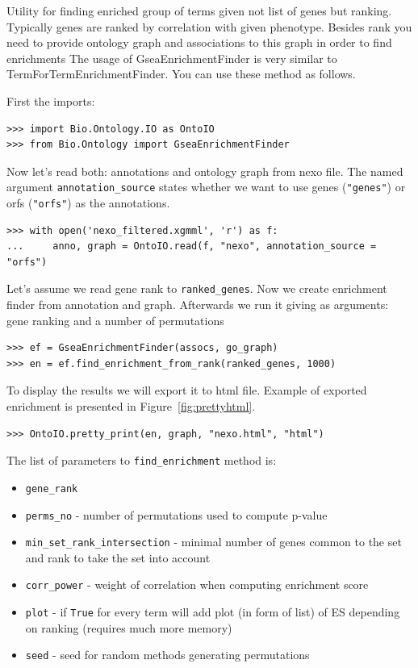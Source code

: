 \documentclass{report}
\begin{document}
Utility for finding enriched group of terms given not list of genes
but ranking. Typically genes are ranked by correlation with given
phenotype. Besides rank you need to provide ontology graph and
associations to this graph in order to find enrichments
The usage of GseaEnrichmentFinder is very similar to
TermForTermEnrichmentFinder. You can use these method as follows.

First the imports:
\begin{verbatim}
>>> import Bio.Ontology.IO as OntoIO
>>> from Bio.Ontology import GseaEnrichmentFinder
\end{verbatim}

Now let's read both: annotations and ontology graph from nexo file. The named
argument \verb|annotation_source| states whether we want to use genes (\verb|"genes"|)
or orfs (\verb|"orfs"|) as the annotations.

\begin{verbatim}
>>> with open('nexo_filtered.xgmml', 'r') as f:
...     anno, graph = OntoIO.read(f, "nexo", annotation_source = "orfs")
\end{verbatim}

Let's assume we read gene rank to \verb|ranked_genes|.
Now we create enrichment finder from annotation and graph. Afterwards we run it
giving as arguments: gene ranking and a number of permutations
\begin{verbatim}
>>> ef = GseaEnrichmentFinder(assocs, go_graph)
>>> en = ef.find_enrichment_from_rank(ranked_genes, 1000)
\end{verbatim}

To display the results we will export it to html file. Example of exported
enrichment is presented in Figure~\ref{fig:prettyhtml}.
\begin{verbatim}
>>> OntoIO.pretty_print(en, graph, "nexo.html", "html")
\end{verbatim}

The list of parameters to \verb|find_enrichment| method is:
\begin{itemize}
\item \verb|gene_rank| 
\item \verb|perms_no| - number of permutations used to compute p-value
\item \verb|min_set_rank_intersection| - minimal number of genes common
to the set and rank to take the set into account
\item \verb|corr_power| - weight of correlation when computing
enrichment score
\item \verb|plot| - if \verb|True| for every term will add plot (in form of list) 
		of ES depending on ranking (requires much more memory)
\item \verb|seed| - seed for random methods generating permutations
\end{itemize}
\end{document}

